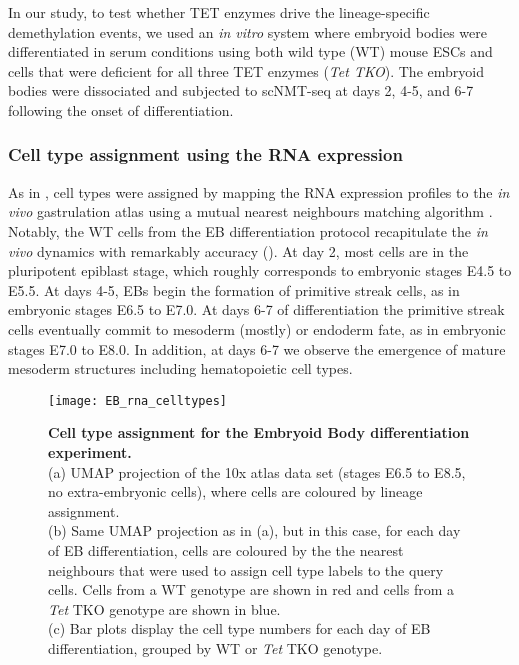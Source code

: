 In our study, to test whether TET enzymes drive the lineage-specific demethylation events, we used an \textit{in vitro} system where embryoid bodies were differentiated in serum conditions using both wild type (WT) mouse ESCs and cells that were deficient for all three TET enzymes (\textit{Tet TKO}). The embryoid bodies were dissociated and subjected to scNMT-seq at days 2, 4-5, and 6-7 following the onset of differentiation.

\subsubsection{Cell type assignment using the RNA expression}

As in , cell types were assigned by mapping the RNA expression profiles to the \textit{in vivo} gastrulation atlas using a mutual nearest neighbours matching algorithm \cite{Haghverdi2018}.\\
Notably, the WT cells from the EB differentiation protocol recapitulate the \textit{in vivo} dynamics with remarkably accuracy (). At day 2, most cells are in the pluripotent epiblast stage, which roughly corresponds to embryonic stages E4.5 to E5.5. At days 4-5, EBs begin the formation of primitive streak cells, as in embryonic stages E6.5 to E7.0. At days 6-7 of differentiation the primitive streak cells eventually commit to mesoderm (mostly) or endoderm fate, as in embryonic stages E7.0 to E8.0. In addition, at days 6-7 we observe the emergence of mature mesoderm structures including hematopoietic cell types.

\begin{figure}[H]
	\centering
	\texttt{[image: EB\_rna\_celltypes]}
	\caption[]{
		\textbf{Cell type assignment for the Embryoid Body differentiation experiment.} \\
		(a) UMAP projection of the 10x atlas data set (stages E6.5 to E8.5, no extra-embryonic cells), where cells are coloured by lineage assignment.\\
		(b) Same UMAP projection as in (a), but in this case, for each day of EB differentiation, cells are coloured by the the nearest neighbours that were used to assign cell type labels to the query cells. Cells from a WT genotype are shown in red and cells from a \textit{Tet} TKO genotype are shown in blue.\\
		(c) Bar plots display the cell type numbers for each day of EB differentiation, grouped by WT or \textit{Tet} TKO genotype. }
	\label{fig:EB_rna_celltypes}
\end{figure}

